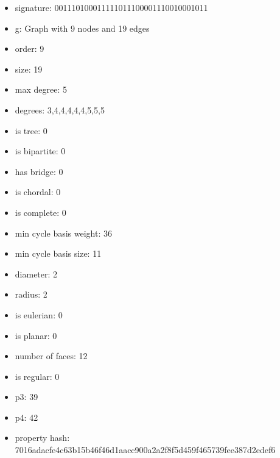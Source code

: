 \newpage
\begin{figure}
\end{figure}
\begin{itemize}
\item signature: 001110100011111011100001110010001011
\item g: Graph with 9 nodes and 19 edges
\item order: 9
\item size: 19
\item max degree: 5
\item degrees: 3,4,4,4,4,4,5,5,5
\item is tree: 0
\item is bipartite: 0
\item has bridge: 0
\item is chordal: 0
\item is complete: 0
\item min cycle basis weight: 36
\item min cycle basis size: 11
\item diameter: 2
\item radius: 2
\item is eulerian: 0
\item is planar: 0
\item number of faces: 12
\item is regular: 0
\item p3: 39
\item p4: 42
\item property hash: 7016adacfe4c63b15b46f46d1aacc900a2a2f8f5d459f465739fee387d2edef6
\end{itemize}
